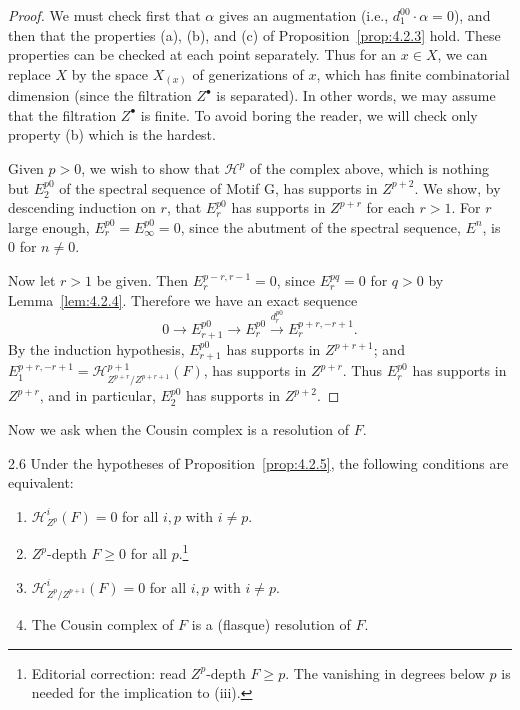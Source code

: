 \begin{proof}
We must check first that $\alpha$ gives an augmentation (i.e., $d_1^{00}\cdot\alpha=0$), and then that the properties (a), (b), and (c) of Proposition~\ref{prop:4.2.3} hold. These properties can be checked at each point separately. Thus for an $x\in X$, we can replace $X$ by the space $X_{(x)}$ of generizations of $x$, which has finite combinatorial dimension (since the filtration $Z^\bullet$ is separated). In other words, we may assume that the filtration $Z^\bullet$ is finite. To avoid boring the reader, we will check only property (b) which is the hardest.

Given $p>0$, we wish to show that $\mathcal{H}^p$ of the complex above, which is nothing but $E_2^{p0}$ of the spectral sequence of Motif G, has supports in $Z^{p+2}$. We show, by descending induction on $r$, that $E_r^{p0}$ has supports in $Z^{p+r}$ for each $r>1$. For $r$ large enough, $E_r^{p0}=E_{\infty}^{p0}=0$, since the abutment of the spectral sequence, $E^n$, is $0$ for $n\neq 0$.

Now let $r>1$ be given. Then $E_r^{p-r,r-1}=0$, since $E_r^{pq}=0$ for $q>0$ by Lemma~\ref{lem:4.2.4}. Therefore we have an exact sequence
\[
0\longrightarrow E_{r+1}^{p0}\longrightarrow E_r^{p0}\xrightarrow{d_r^{p0}} E_r^{p+r,-r+1}.
\]
By the induction hypothesis, $E_{r+1}^{p0}$ has supports in $Z^{p+r+1}$; and $E_1^{p+r,-r+1}= \mathcal{H}_{Z^{p+r}/Z^{p+r+1}}^{p+1}(F)$, has supports in $Z^{p+r}$. Thus $E_r^{p0}$ has supports in $Z^{p+r}$, and in particular, $E_2^{p0}$ has supports in $Z^{p+2}$.
\end{proof}

Now we ask when the Cousin complex is a resolution of $F$.

\begin{bookproposition}{2.6}\label{prop:4.2.6}
Under the hypotheses of Proposition~\ref{prop:4.2.5}, the following conditions are equivalent:
\begin{enumerate}
\item[(i)] $\mathcal{H}_{Z^p}^{i}(F)=0$ for all $i,p$ with $i\neq p$.
\item[(ii)] $Z^{p}$-depth $F\geq 0$ for all $p$.\footnote{Editorial correction: read $Z^p$-depth $F\geq p$. The vanishing in degrees below $p$ is needed for the implication to (iii).}
\item[(iii)] $\mathcal{H}_{Z^{p}/Z^{p+1}}^{i}(F)=0$ for all $i,p$ with $i\neq p$.
\item[(iv)] The Cousin complex of $F$ is a (flasque) resolution of $F$.
\end{enumerate}
\end{bookproposition}

